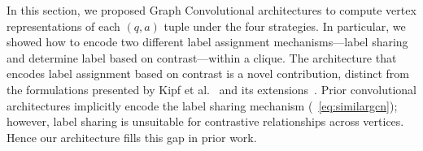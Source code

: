 
In this section, we proposed Graph Convolutional architectures to compute vertex representations of each $(q,a)$ tuple under the four strategies. %
In particular, we showed how to encode two different label assignment mechanisms---label sharing and determine label based on contrast---within a clique. The architecture that encodes label assignment based on contrast is a novel contribution, distinct from the formulations presented by Kipf et al.~\cite{gcn} and its extensions~\cite{signedgcn,relationalGCN}. Prior convolutional architectures implicitly encode the label sharing mechanism (~\cref{eq:similargcn}); however, label sharing is unsuitable for contrastive relationships across vertices. Hence our architecture fills this gap in prior work.


